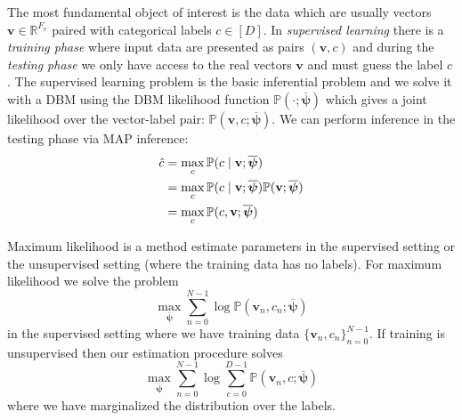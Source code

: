 \documentclass{article} %
\begin{document}
The most fundamental object of interest is the data which are usually vectors $\mathbf{v}\in\mathbb{R}^{F_v}$ paired
with categorical labels $c\in [D]$.  In {\it supervised learning} there is a {\it training phase } where input data
are presented as pairs $(\mathbf{v},c)$ and during the {\it testing phase} we only have access to the real vectors
$\mathbf{v}$ and must guess the label $c$.  The supervised learning problem is the basic inferential problem and we solve it
with a DBM using the DBM likelihood function $\mathbb{P}(\cdot ; \overline{\boldsymbol{\psi}})$ which gives a joint likelihood
over the vector-label pair: $\mathbb{P}(\mathbf{v},c ; \overline{\boldsymbol{\psi}})$.  We can perform inference in the testing
phase via MAP inference:
\begin{align}
\hat{c} &= \max_c \mathbb{P}(c\mid \mathbf{v}; \overline{\boldsymbol{\psi}}) \notag\\
& = \max_c \mathbb{P}(c\mid \mathbf{v}; \overline{\boldsymbol{\psi}}) \mathbb{P}(\mathbf{v}; \overline{\boldsymbol{\psi}}) \notag\\
& = \max_c \mathbb{P}(c, \mathbf{v}; \overline{\boldsymbol{\psi}}) 
\end{align}

Maximum likelihood is a method estimate parameters in the supervised setting or the unsupervised setting (where the training data has no labels).
For maximum likelihood we solve the problem
\begin{equation}
\max_{\overline{\boldsymbol{\psi}}} \sum_{n=0}^{N-1}\log \mathbb{P}(\mathbf{v}_n, c_n;\overline{\boldsymbol{\psi}})
\end{equation}
in the supervised setting where we have training data $\{ \mathbf{v}_n, c_n\}_{n=0}^{N-1}$.  If training is unsupervised then our estimation
procedure solves
\begin{equation}
\max_{\overline{\boldsymbol{\psi}}} \sum_{n=0}^{N-1} \log \sum_{c=0}^{D-1}\mathbb{P}(\mathbf{v}_n, c;\overline{\boldsymbol{\psi}})
\end{equation}
where we have marginalized the distribution over the labels.
\end{document}

